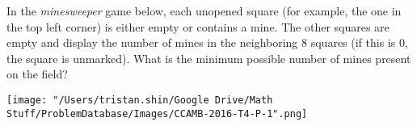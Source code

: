 In the \emph{minesweeper} game below, each unopened square (for example, the one in the top left corner) is either empty or contains a mine. The other squares are empty and display the number of mines in the neighboring 8 squares (if this is 0, the square is unmarked). What is the minimum possible number of mines present on the field?
\begin{center}
	\texttt{[image: "/Users/tristan.shin/Google Drive/Math Stuff/ProblemDatabase/Images/CCAMB-2016-T4-P-1".png]}
\end{center}